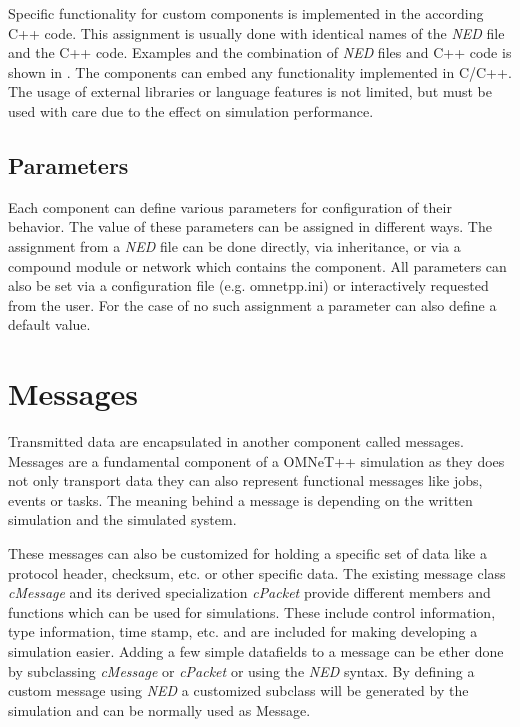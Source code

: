 Specific functionality for custom components is implemented in the according C++ code.
This assignment is usually done with identical names of the \emph{NED} file and the C++ code.
Examples and the combination of \emph{NED} files and C++ code is shown in \cite[chapter 3, chapter 4]{omnet_manual}.
The components can embed any functionality implemented in C/C++.
The usage of external libraries or language features is not limited, but must be used with care due to the effect on simulation performance.

\subsection{Parameters}
Each component can define various parameters for configuration of their behavior.
The value of these parameters can be assigned in different ways.
The assignment from a \emph{NED} file can be done directly, via inheritance, or via a compound module or network which contains the component.
All parameters can also be set via a configuration file (e.g. omnetpp.ini) or interactively requested from the user.
For the case of no such assignment a parameter can also define a default value. \cite[section 3.6]{omnet_manual}


\section{Messages}
Transmitted data are encapsulated in another component called messages.
Messages are a fundamental component of a OMNeT++ simulation as they does not only transport data they can also represent functional messages like jobs, events or tasks.
The meaning behind a message is depending on the written simulation and the simulated system.

These messages can also be customized for holding a specific set of data like a protocol header, checksum, etc. or other specific data.
The existing message class \emph{cMessage} and its derived specialization \emph{cPacket} provide different members and functions which can be used for simulations.
These include control information, type information, time stamp, etc. and are included for making developing a simulation easier.
Adding a few simple datafields to a message can be ether done by subclassing \emph{cMessage} or \emph{cPacket} or using the \emph{NED} syntax.
By defining a custom message using \emph{NED} a customized subclass will be generated by the simulation and can be normally used as Message.

